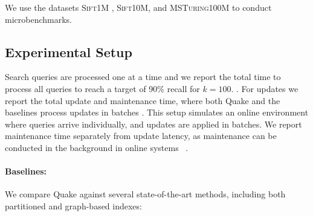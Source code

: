 We use the datasets \textsc{Sift1M} \cite{jegou2010product}, \textsc{Sift10M},  and \textsc{MSTuring100M} \cite{bigann} to conduct microbenchmarks.

\subsection{Experimental Setup}


Search queries are processed one at a time and we report the total time to process all queries to reach a target of 90\% recall for $k=100$. . For updates we report the total update and maintenance time, where both Quake and the baselines process updates in batches . This setup simulates an online environment where queries arrive individually, and updates are applied in batches. We report maintenance time separately from update latency, as maintenance can be conducted in the background in online systems ~\cite{xu_spfresh_2023}. 

\paragraph{Baselines:} We compare Quake against several state-of-the-art methods, including both partitioned and graph-based indexes:

